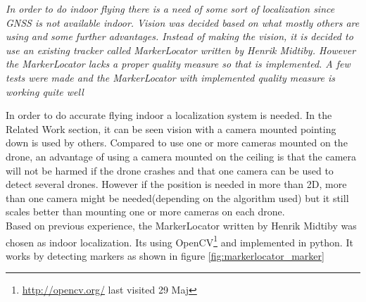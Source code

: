 \textit{In order to do indoor flying there is a need of some sort of localization since GNSS is not available indoor. Vision was decided based on what mostly others are using and some further advantages. Instead of making the vision, it is decided to use an existing tracker called MarkerLocator written by Henrik Midtiby. However the MarkerLocator lacks a proper quality measure so that is implemented. A few tests were made and the MarkerLocator with implemented quality measure is working quite well}


In order to do accurate flying indoor a localization system is needed. In the Related Work section, it can be seen vision with a camera mounted pointing down is used by others. Compared to use one or more cameras mounted on the drone, an advantage of using a camera mounted on the ceiling is that the camera will not be harmed if the drone crashes and that one camera can be used to detect several drones. However if the position is needed in more than 2D, more than one camera might be needed(depending on the algorithm used) but it still scales better than mounting one or more cameras on each drone. \\

Based on previous experience, the MarkerLocator written by Henrik Midtiby was chosen as indoor localization. Its using OpenCV\footnote{\url{http://opencv.org/} last visited 29 Maj} and implemented in python. It works by detecting markers as shown in figure \ref{fig:markerlocator_marker}



